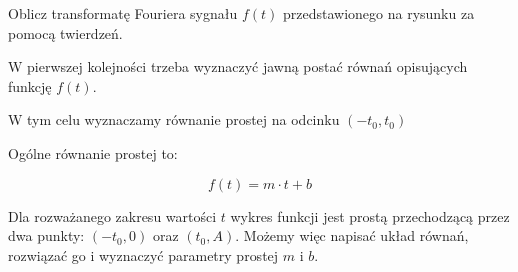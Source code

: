 \begin{task}
Oblicz transformatę Fouriera sygnału $f(t)$ przedstawionego na rysunku za pomocą twierdzeń.

\begin{figure}[H]
\centering
{}
\end{figure}

W pierwszej kolejności trzeba wyznaczyć jawną postać równań opisujących funkcję $f(t)$.


W tym celu wyznaczamy równanie prostej na odcinku $(-t_{0}, t_0)$ 

Ogólne równanie prostej to:

\begin{equation}
f(t) = m \cdot t + b
\end{equation}

Dla rozważanego zakresu wartości $t$ wykres funkcji jest prostą przechodzącą przez dwa punkty: $(-t_{0},0)$ oraz $(t_{0},A)$. Możemy więc napisać układ równań, rozwiązać go i wyznaczyć parametry prostej $m$ i $b$.


\end{task}
